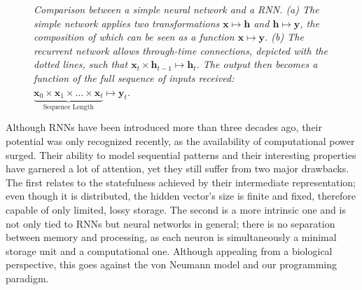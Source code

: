 \documentclass[]{article}
\begin{document}
\begin{figure}[h!]
\begin{minipage}{0.5\textwidth}
	\end{minipage}
	\caption[Hello world]
	{\small \textit{Comparison between a simple neural network and a RNN. (a) The simple network applies two transformations $\pmb{x} \mapsto \pmb{h}$ and $\pmb{h} \mapsto \pmb{y}$, the composition of which can be seen as a function $\pmb{x} \mapsto \pmb{y}$. (b) The recurrent network allows through-time connections, depicted with the dotted lines, such that $\pmb{x}_t \times \pmb{h}_{t-1} \mapsto \pmb{h}_t$. The output then becomes a function of the full sequence of inputs received: $\underbrace{\pmb{x}_0 \times \pmb{x}_1 \times \dots \times \pmb{x}_t}_{\text{Sequence Length}} \mapsto \pmb{y}_t$.}\label{fig:1}}
\end{figure}

Although RNNs have been introduced more than three decades ago, their potential was only recognized recently, as the availability of computational power surged. Their ability to model sequential patterns and their interesting properties have garnered a lot of attention, yet they still suffer from two major drawbacks. The first relates to the statefulness achieved by their intermediate representation; even though it is distributed, the hidden vector's size is finite and fixed, therefore capable of only limited, lossy storage. The second is a more intrinsic one and is not only tied to RNNs but neural networks in general; there is no separation between memory and processing, as each neuron is simultaneously a minimal storage unit and a computational one. Although appealing from a biological perspective, this goes against the von Neumann model and our programming paradigm. 
\end{document}
